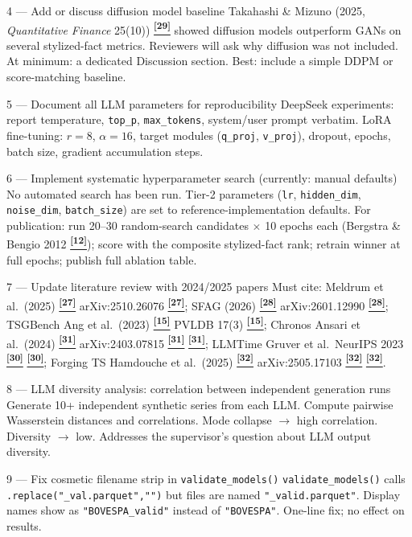 \documentclass[10pt]{article}
\newcommand{\tcite}[1]{%
  \hyperlink{R:#1}{\textsuperscript{\scriptsize\textbf{[#1]}}}}
\begin{document}
%
  {4 --- Add or discuss diffusion model baseline}%
  {Takahashi \& Mizuno (2025, \textit{Quantitative Finance} 25(10))\tcite{29} showed diffusion models outperform GANs on several stylized-fact metrics. Reviewers will ask why diffusion was not included. At minimum: a dedicated Discussion section. Best: include a simple DDPM or score-matching baseline.}

%
  {5 --- Document all LLM parameters for reproducibility}%
  {DeepSeek experiments: report temperature, \texttt{top\_p}, \texttt{max\_tokens}, system/user prompt verbatim. LoRA fine-tuning: $r=8$, $\alpha=16$, target modules (\texttt{q\_proj}, \texttt{v\_proj}), dropout, epochs, batch size, gradient accumulation steps.}

%
  {6 --- Implement systematic hyperparameter search (currently: manual defaults)}%
  {No automated search has been run. Tier-2 parameters (\texttt{lr}, \texttt{hidden\_dim}, \texttt{noise\_dim}, \texttt{batch\_size}) are set to reference-implementation defaults. For publication: run 20--30 random-search candidates $\times$ 10 epochs each (Bergstra \& Bengio 2012\tcite{12}); score with the composite stylized-fact rank; retrain winner at full epochs; publish full ablation table.}

%
  {7 --- Update literature review with 2024/2025 papers}%
  {Must cite: Meldrum et al.\ (2025)\tcite{27} arXiv:2510.26076\tcite{27}; SFAG (2026)\tcite{28} arXiv:2601.12990\tcite{28}; TSGBench Ang et al.\ (2023)\tcite{15} PVLDB 17(3)\tcite{15}; Chronos Ansari et al.\ (2024)\tcite{31} arXiv:2403.07815\tcite{31}\tcite{31}; LLMTime Gruver et al.\ NeurIPS 2023\tcite{30}\tcite{30}; Forging TS Hamdouche et al.\ (2025)\tcite{32} arXiv:2505.17103\tcite{32}\tcite{32}.}

%
  {8 --- LLM diversity analysis: correlation between independent generation runs}%
  {Generate 10+ independent synthetic series from each LLM. Compute pairwise Wasserstein distances and correlations. Mode collapse $\to$ high correlation. Diversity $\to$ low. Addresses the supervisor's question about LLM output diversity.}

%
  {9 --- Fix cosmetic filename strip in \texttt{validate\_models()}}%
  {\texttt{validate\_models()} calls \texttt{.replace("\_val.parquet","")} but files are named \texttt{"\_valid.parquet"}. Display names show as \texttt{"BOVESPA\_valid"} instead of \texttt{"BOVESPA"}. One-line fix; no effect on results.}
\end{document}
